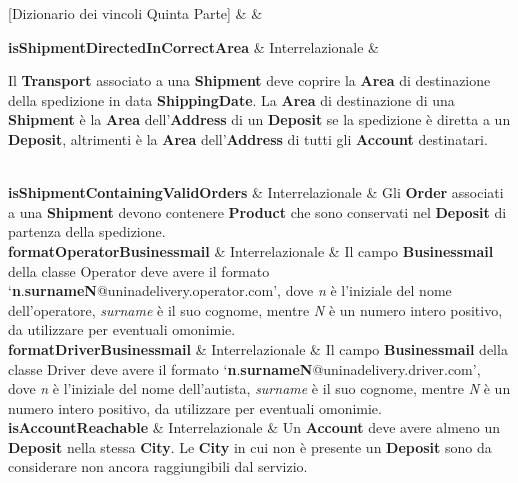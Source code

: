 [Dizionario dei vincoli Quinta Parte]{ &  & }{

  \textbf{isShipmentDirectedInCorrectArea} & Interrelazionale &
  {\footnotesize

  Il \textbf{Transport} associato a una \textbf{Shipment} deve coprire la \textbf{Area} di destinazione della spedizione in data \textbf{ShippingDate}.
  La \textbf{Area} di destinazione di una \textbf{Shipment} è la \textbf{Area} dell'\textbf{Address} di un \textbf{Deposit} se la spedizione è diretta a un \textbf{Deposit}, altrimenti è la \textbf{Area} dell'\textbf{Address} di tutti gli \textbf{Account} destinatari.
  
  }\\

  \textbf{isShipmentContainingValidOrders} & Interrelazionale &
  {\footnotesize 
  Gli \textbf{Order} associati a una \textbf{Shipment} devono contenere \textbf{Product} che sono conservati nel \textbf{Deposit} di partenza della spedizione.
  }\\

  \textbf{formatOperatorBusinessmail} & Interrelazionale &
  {\footnotesize
  Il campo \textbf{Businessmail} della classe Operator deve avere il formato `\textbf{n}.\textbf{surnameN}@uninadelivery.operator.com', dove \textit{n} è l'iniziale del nome dell'operatore, \textit{surname} è il suo cognome, mentre \textit{N} è un numero intero positivo, da utilizzare per eventuali omonimie.
  }\\
  
  \textbf{formatDriverBusinessmail} & Interrelazionale &
  {\footnotesize
  Il campo \textbf{Businessmail} della classe Driver deve avere il formato `\textbf{n}.\textbf{surnameN}@uninadelivery.driver.com', dove \textit{n} è l'iniziale del nome dell'autista, \textit{surname} è il suo cognome, mentre \textit{N} è un numero intero positivo, da utilizzare per eventuali omonimie.
  }\\

  \textbf{isAccountReachable} & Interrelazionale &
  {\footnotesize
  Un \textbf{Account} deve avere almeno un \textbf{Deposit} nella stessa \textbf{City}. Le \textbf{City} in cui non è presente un \textbf{Deposit} sono da considerare non ancora raggiungibili dal servizio.
  }\\
}